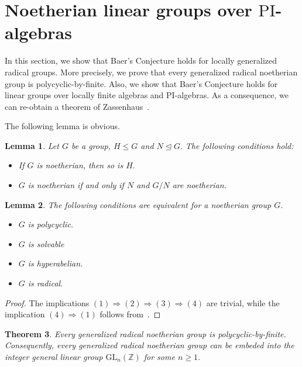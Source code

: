 \documentclass{amsart}
\newtheorem{theorem}{Theorem}[section]
\newtheorem{lemma}[theorem]{Lemma}
\theoremstyle{definition}
\begin{document}
\section{Noetherian linear groups over $\mathrm{PI}$-algebras}\label{S8}

In this section, we show that Baer's Conjecture holds for locally generalized radical groups. More precisely, we prove that every generalized radical noetherian group is polycyclic-by-finite. Also, we show that  Baer's Conjecture holds for linear groups over locally finite algebras and PI-algebras. As a consequence, we can re-obtain a theorem of Zassenhaus~\cite[Theorem 1]{Zassenhaus_1969}.

The following lemma is obvious.
\begin{lemma}\label{lem:8.1} Let $G$ be a group, $H\leq G$ and $N\trianglelefteq G.$ The following conditions hold:
	\begin{itemize}
		\rm\item [(1)]\textit{If $G$ is noetherian, then so is $H.$}
		\item [(2)]\textit{$G$ is noetherian if and only if $N$ and $G/N$ are noetherian.}
	\end{itemize}
\end{lemma}
\begin{lemma}\label{lem:8.2} The following conditions are equivalent for a noetherian group $G.$
	\begin{itemize} 
		\rm\item [(1)]\textit{$G$ is polycyclic.}
		\item [(2)]\textit{$G$ is solvable}
		\item [(3)]\textit{$G$ is hyperabelian.}
		\item [(4)]\textit{$G$ is radical.}  
	\end{itemize}
\end{lemma}
\begin{proof} The implications $(1)\Rightarrow (2) \Rightarrow (3)\Rightarrow (4)$ are trivial, while the implication $(4)\Rightarrow (1)$ follows from~\cite[Lemma 3.1]{Pa_ChNaHa_25}.
\end{proof}
\begin{theorem}\label{th:8.3} Every generalized radical noetherian group is polycyclic-by-finite. Consequently, every generalized radical noetherian group can be embeded into the integer general linear group $\mathrm{GL}_n(\mathbb{Z})$ for some $n\geq 1.$
\end{theorem}
\end{document}
